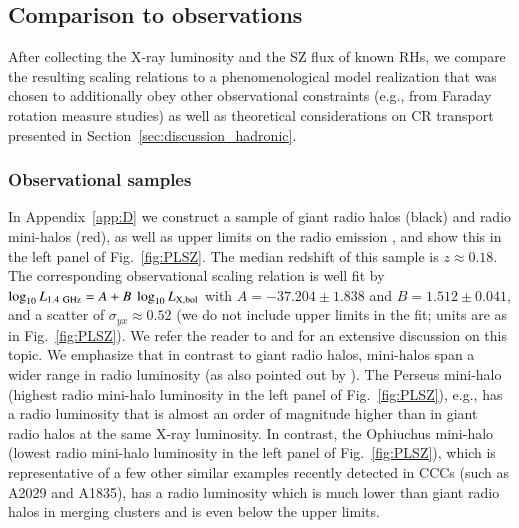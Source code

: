 \documentclass[useAMS,usenatbib]{mn2e}
\begin{document}
\subsection{Comparison to observations}
\label{sec:scaling-obs}
 
After collecting the X-ray luminosity and the SZ flux of known RHs, we compare
the resulting scaling relations to a phenomenological model realization that was
chosen to additionally obey other observational constraints (e.g., from Faraday
rotation measure studies) as well as theoretical considerations on CR transport
presented in Section~\ref{sec:discussion_hadronic}.


\subsubsection{Observational samples}

In Appendix~\ref{app:D} we construct a sample of giant radio halos (black) and
radio mini-halos (red), as well as upper limits on the radio emission
\citep{2009A&A...507..661B, 2011A&A...527A..99E, 2009A&A...499..371G}, and show
this in the left panel of Fig.~\ref{fig:PLSZ}. The median redshift of this
sample is $z\approx0.18$. The corresponding observational scaling relation is
well fit by $\log_{10} L_{1.4~{\mathrm{GHz}}} = A + B~\log_{10} L_{{\mathrm{X,bol}}}$ with
$A=-37.204\pm1.838$ and $B=1.512\pm0.041$, and a scatter of $\sigma_{yx} \approx
0.52$ (we do not include upper limits in the fit; units are as in
Fig.~\ref{fig:PLSZ}). We refer the reader to \cite{2009A&A...507..661B} and
\cite{2011A&A...527A..99E} for an extensive discussion on this topic. We
emphasize that in contrast to giant radio halos, mini-halos span a wider range
in radio luminosity (as also pointed out by \citealp{2009A&A...499..679M}). The
Perseus mini-halo (highest radio mini-halo luminosity in the left panel of
Fig.~\ref{fig:PLSZ}), e.g., has a radio luminosity that is almost an order of
magnitude higher than in giant radio halos at the same X-ray luminosity. In
contrast, the Ophiuchus mini-halo (lowest radio mini-halo luminosity in the left
panel of Fig.~\ref{fig:PLSZ}), which is representative of a few other similar
examples recently detected in CCCs (such as A2029 and A1835), has a radio
luminosity which is much lower than giant radio halos in merging clusters and is
even below the upper limits.
\end{document}
